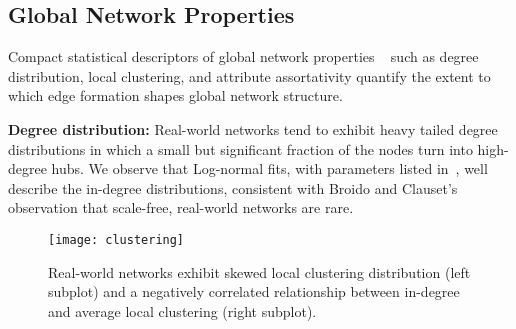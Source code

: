 %


\subsection{Global Network Properties}
\label{subsec:factors}

Compact statistical descriptors of global network properties ~\cite{newman2010networks}
such as degree distribution, local clustering, and attribute assortativity
quantify the extent to which edge formation shapes global network
structure.

\textbf{Degree distribution:}
Real-world networks tend to exhibit heavy tailed degree distributions in which
a small but significant fraction of the nodes turn into high-degree hubs.
We observe that Log-normal fits, with parameters listed in~, well describe
the in-degree distributions, consistent with Broido and
Clauset's~\cite{broido2018scale} observation that scale-free, real-world networks
are rare.

\begin{figure}
 \centering
 \texttt{[image: clustering]}
 \caption{
    Real-world networks exhibit
    skewed local clustering distribution (left subplot) and a negatively correlated
    relationship between in-degree and average local clustering (right subplot).
 }
 \label{fig:cc_dc}
\end{figure}

